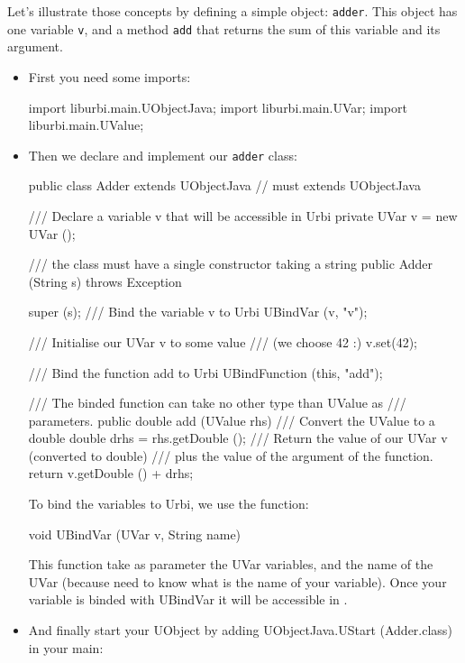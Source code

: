 Let's illustrate those concepts by defining a simple object:
\lstinline{adder}. This object has one variable \lstinline{v}, and a
method \lstinline{add} that returns the sum of this variable and its
argument.

\begin{itemize}
\item First you need some imports:

\begin{cxx}
import liburbi.main.UObjectJava;
import liburbi.main.UVar;
import liburbi.main.UValue;
\end{cxx}

\item Then we declare and implement our \lstinline{adder} class:
\begin{cxx}
public class Adder extends UObjectJava // must extends UObjectJava
{
    /// Declare a variable v that will be accessible in Urbi
    private UVar v = new UVar ();

    /// the class must have a single constructor taking a string
    public Adder (String s)
      throws Exception {

    	super (s);
    	/// Bind the variable v to Urbi
    	UBindVar (v, "v");

    	/// Initialise our UVar v to some value
    	/// (we choose 42 :)
    	v.set(42);

    	/// Bind the function add to Urbi
    	UBindFunction (this, "add");
    }

    /// The binded function can take no other type than UValue as
    /// parameters.
    public double add (UValue rhs) {
    	/// Convert the UValue to a double
    	double drhs = rhs.getDouble ();
    	/// Return the value of our UVar v (converted to double)
    	/// plus the value of the argument of the function.
    	return v.getDouble () + drhs;
    }
}
\end{cxx}

To bind the variables to Urbi, we use the function:
\begin{cxx}
void UBindVar (UVar v, String name)
\end{cxx}

This function take as parameter the UVar variables, and the name of the
UVar (because \urbi need to know what is the name of your variable).
Once your variable is binded with UBindVar it will be accessible in \urbi.

\item And finally start your UObject by adding UObjectJava.UStart (Adder.class) in
your main:


\end{itemize}
